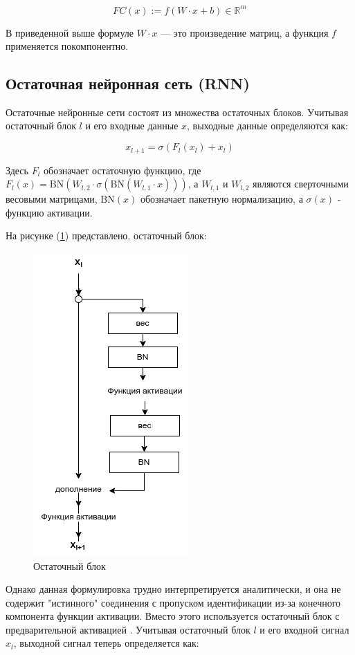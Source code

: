 \[
    FC(x) := f(W \cdot x + b) \in \mathbb{R}^{m}
\]

В приведенной выше формуле \(W \cdot x\) — это произведение матриц, а функция \(f\) применяется покомпонентно.

\subsection{Остаточная нейронная сеть (RNN)}

Остаточные нейронные сети состоят из множества остаточных блоков. Учитывая остаточный блок \(l\) и его входные данные \(x\), выходные данные определяются как:

\[
    x_{l + 1} = \sigma(F_{l}(x_{l}) + x_{l})
\]

Здесь \(F_{l}\) обозначает остаточную функцию, где \(F_{l}(x) = \text{BN}(W_{l,2} \cdot \sigma(\text{BN}(W_{l,1} \cdot x)))\), а \(W_{l,1}\) и \(W_{l,2}\) являются сверточными весовыми матрицами, \(\text{BN}(x)\) обозначает пакетную нормализацию, а \(\sigma(x)\) - функцию активации.

На рисунке (\ref{fig:residual-block}) представлено, остаточный блок: 
\begin{figure}[H]
	\centering
	\includegraphics[width=0.3\linewidth]{images/residual-block.png}
	\caption{Остаточный блок}
	\label{fig:residual-block}
\end{figure}

Однако данная формулировка трудно интерпретируется аналитически, и она не содержит "истинного" соединения с пропуском идентификации из-за конечного компонента функции активации. Вместо этого используется остаточный блок с предварительной активацией \cite{he2016identity}. Учитывая остаточный блок \(l\) и его входной сигнал \(x_{l}\), выходной сигнал теперь определяется как:

